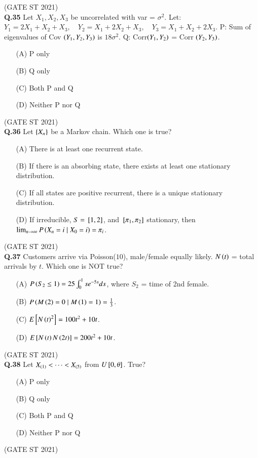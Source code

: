 \documentclass[journal,12pt,onecolumn]{IEEEtran}
\theoremstyle{remark}
\begin{document}
\hfill (GATE ST 2021) \\
\textbf{Q.35}
Let $X_1, X_2, X_3$ be uncorrelated with var = $\sigma^2$. Let:
$
Y_1 = 2X_1 + X_2 + X_3,\quad Y_2 = X_1 + 2X_2 + X_3,\quad Y_3 = X_1 + X_2 + 2X_3.
$
P: Sum of eigenvalues of Cov $\left(Y_1,Y_2,Y_3\right)$ is $18\sigma^2$.  
Q: Corr$\left(Y_1,Y_2\right)$ = Corr $\left(Y_2,Y_3\right)$.
\begin{enumerate}
\item[(A)] P only
\item[(B)] Q only
\item[(C)] Both P and Q
\item[(D)] Neither P nor Q
\end{enumerate}

\hfill (GATE ST 2021) \\


\textbf{Q.36}
Let $\left\{X_n\right\}$ be a Markov chain. Which one is true?
\begin{enumerate}
\item[(A)] There is at least one recurrent state.
\item[(B)] If there is an absorbing state, there exists at least one stationary distribution.
\item[(C)] If all states are positive recurrent, there is a unique stationary distribution.
\item[(D)] If irreducible, $S = {}\left[1,2\right]$, and ${}\left[\pi_1,\pi_2\right]$ stationary, then $\lim_{n\to\infty} P\left(X_n=i \mid X_0=i\right) = \pi_i$.
\end{enumerate}

\hfill (GATE ST 2021) \\

\textbf{Q.37}
Customers arrive via Poisson($10$), male/female equally likely. $N\left(t\right)$ = total arrivals by $t$. Which one is NOT true?
\begin{enumerate}
\item[(A)] $P\left(S_2 \le 1\right) = 25 \int_0^1 s e^{-5s} ds$, where $S_2$ = time of 2nd female.
\item[(B)] $P\left(M\left(2\right) = 0 \mid M\left(1\right) = 1\right) = \frac13$.
\item[(C)] $E{}\left[N\left(t\right)^2\right]= 100t^2 + 10t$.
\item[(D)] $E{}\left[N\left(t\right)N\left(2t\right)\right] = 200t^2 + 10t$.
\end{enumerate}
\hfill (GATE ST 2021) \\

\textbf{Q.38}
Let $X_{\left(1\right)} < \dots < X_{\left(5\right)}$ from $U{}\left[0,\theta\right]$. True?
\begin{enumerate}
\item[(A)] P only
\item[(B)] Q only
\item[(C)] Both P and Q
\item[(D)] Neither P nor Q
\end{enumerate}
\hfill (GATE ST 2021) \\
\end{document}
